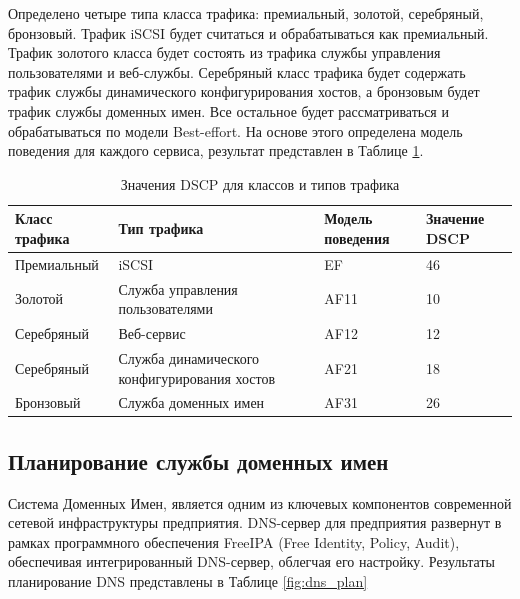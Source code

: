 \documentclass[14pt, a4paper]{extarticle}
\numberwithin{equation}{section}
\begin{document}
Определено четыре типа класса трафика: премиальный, золотой, серебряный, бронзовый. 
Трафик iSCSI будет считаться и обрабатываться как премиальный. Трафик золотого класса будет состоять 
из трафика службы управления пользователями и веб-службы. 
Серебряный класс трафика будет содержать трафик службы динамического конфигурирования хостов, а 
бронзовым будет трафик службы доменных имен. Все остальное будет рассматриваться и обрабатываться по модели Best-effort.
На основе этого определена модель поведения для каждого сервиса, результат представлен в Таблице \ref{table:qos}.

\begin{table}[H]
\centering
\small
\caption{Значения DSCP для классов и типов трафика}
\label{table:qos}
\begin{tabular}{|m{3cm}|m{3cm}|m{3cm}|m{3cm}|}
\hline
\textbf{Класс трафика} & \textbf{Тип трафика} & \textbf{Модель поведения} & \textbf{Значение DSCP} \\
\hline
Премиальный & iSCSI & EF & 46 \\
\hline
Золотой & Служба управления пользователями & AF11 & 10 \\
\hline
Серебряный & Веб-сервис & AF12 & 12 \\
\hline
Серебряный & Служба динамического конфигурирования хостов & AF21 & 18 \\
\hline
Бронзовый & Служба доменных имен & AF31 & 26 \\
\hline
\end{tabular}
\end{table}



\subsection{Планирование службы доменных имен}
Система Доменных Имен, является одним из ключевых компонентов современной 
сетевой инфраструктуры предприятия. 
DNS-сервер для предприятия развернут в рамках программного
обеспечения FreeIPA (Free Identity, Policy, Audit), обеспечивая интегрированный
DNS-сервер, облегчая его настройку.
Результаты планирование DNS представлены в Таблице \ref{fig:dns_plan}
\end{document}
